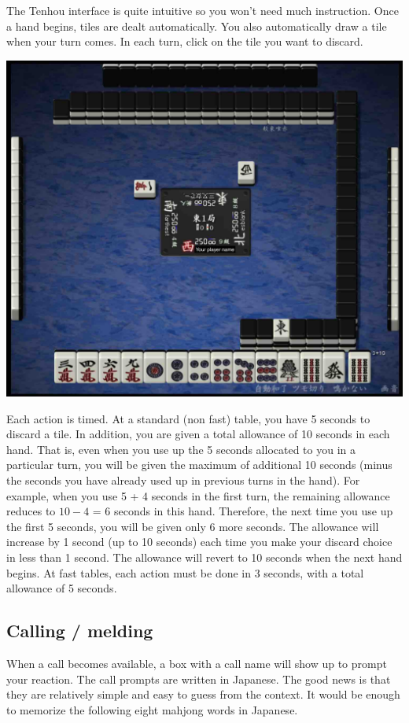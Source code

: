 \bigskip
The {\jap Tenhou} interface is quite intuitive so you won't need much instruction. 
Once a hand begins, tiles are dealt automatically. You also automatically draw a tile when your turn comes. 
In each turn, click on the tile you want to discard. 

\begin{center}
\includegraphics[width=.6\textwidth,clip]{figs/interface.jpg}
\end{center}
\vspace{-25pt}

\bigskip
Each action is timed. At a standard (non fast) table, you have 5 seconds to discard a tile. In addition, you are given a total allowance of 10 seconds in each hand. That is, even when you use up the 5 seconds allocated to you in a particular turn, you will be given the maximum of additional 10 seconds (minus the seconds you have already used up in previous turns in the hand). For example, when you use 5 + 4 seconds in the first turn, the remaining allowance reduces to $10 - 4$ = 6 seconds in this hand. Therefore, the next time you use up the first 5 seconds, you will be given only 6 more seconds. The allowance will increase by 1 second (up to 10 seconds) each time you make your discard choice in less than 1 second. The allowance will revert to 10 seconds when the next hand begins. At fast tables, each action must be done in 3 seconds, with a total allowance of 5 seconds.

\subsection{Calling / melding}
When a call becomes available, a box with a call name will show up to prompt your reaction. 
The call prompts are written in Japanese. The good news is that they are relatively simple and easy to guess from the context. It would be enough to memorize the following eight mahjong words in Japanese. 

